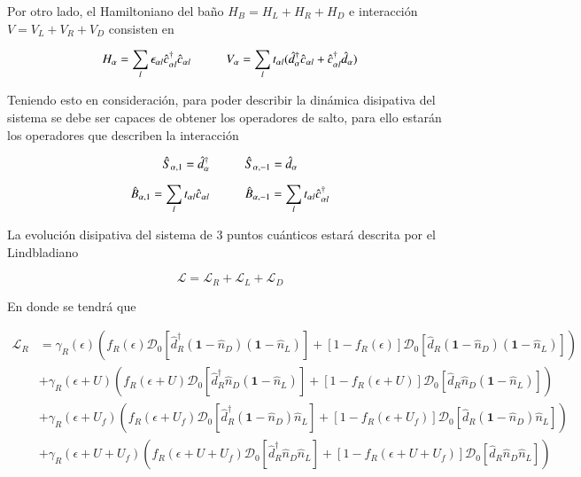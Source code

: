 Por otro lado, el Hamiltoniano del baño $H_{B} = H_{L} + H_{R} + H_{D}$ e interacción $V = V_{L} + V_{R} + V_{D}$ consisten en

\begin{equation*}
    H_{\alpha} = \sum_{l} \epsilon_{\alpha l} \hat{c}^{\dagger}_{\alpha l}\hat{c}_{\alpha l} \hspace{10mm} V_{\alpha} = \sum_{l} t_{\alpha l} ( \hat{d}^{\dagger}_{\alpha} \hat{c}_{\alpha l} + \hat{c}^{\dagger}_{\alpha l} \hat{d}_{\alpha} )
\end{equation*}

Teniendo esto en consideración, para poder describir la dinámica disipativa del sistema se debe ser capaces de obtener los operadores de salto, para ello estarán los operadores que describen la interacción

\begin{equation*}
    \hat{S}_{\alpha,1} = \hat{d}^{\dagger}_{\alpha} \hspace{10mm} \hat{S}_{\alpha,-1} = \hat{d}_{\alpha}
\end{equation*}

\begin{equation*}
    \hat{B}_{\alpha,1} = \sum_{l}t_{\alpha l} \hat{c}_{\alpha l} \hspace{10mm} \hat{B}_{\alpha,-1} = \sum_{l}t_{\alpha l} \hat{c}^{\dagger}_{\alpha l}
\end{equation*}

La evolución disipativa del sistema de 3 puntos cuánticos estará descrita por el Lindbladiano 

\begin{equation}
    \mathcal{L} = \mathcal{L}_{R} + \mathcal{L}_{L} + \mathcal{L}_{D}
    \label{Lindbladsec5}
\end{equation}

En donde se tendrá que 

\begin{align*}
    \mathcal{L}_{R} & = \gamma_{R}(\epsilon)(f_{R}(\epsilon)\mathcal{D}_{0}[\hat{d}^{\dagger}_{R}(\textbf{1}-\hat{n}_{D})(\textbf{1}-\hat{n}_{L}) ]  + [1-f_{R}(\epsilon)]\mathcal{D}_{0}[\hat{d}_{R}(\textbf{1}-\hat{n}_{D})(\textbf{1}-\hat{n}_{L}) ]  )  \\
                    & + \gamma_{R}(\epsilon+U)(f_{R}(\epsilon+U)\mathcal{D}_{0}[\hat{d}^{\dagger}_{R}\hat{n}_{D}(\textbf{1}-\hat{n}_{L}) ]  + [1-f_{R}(\epsilon+U)]\mathcal{D}_{0}[\hat{d}_{R}\hat{n}_{D}(\textbf{1}-\hat{n}_{L}) ]  ) \\
                   & + \gamma_{R}(\epsilon+U_{f})(f_{R}(\epsilon+U_{f})\mathcal{D}_{0}[\hat{d}^{\dagger}_{R}(\textbf{1}-\hat{n}_{D})\hat{n}_{L} ]  + [1-f_{R}(\epsilon+U_{f})]\mathcal{D}_{0}[\hat{d}_{R}(\textbf{1}-\hat{n}_{D})\hat{n}_{L} ]  ) \\
                  & + \gamma_{R}(\epsilon+U+U_{f})(f_{R}(\epsilon+U+U_{f})\mathcal{D}_{0}[\hat{d}^{\dagger}_{R}\hat{n}_{D}\hat{n}_{L} ]  + [1-f_{R}(\epsilon+U+U_{f})]\mathcal{D}_{0}[\hat{d}_{R}\hat{n}_{D}\hat{n}_{L} ]  ) 
\end{align*}

